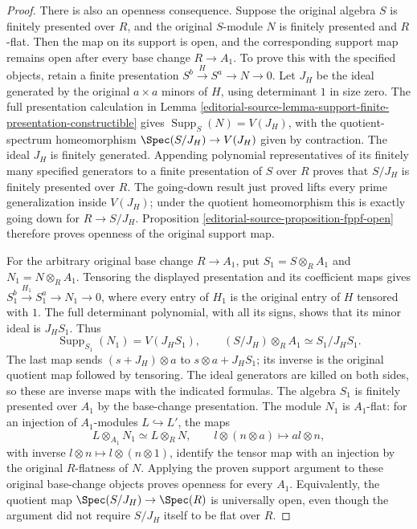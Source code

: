\begin{proof}
\medskip\noindent
There is also an openness consequence. Suppose the
original algebra $S$ is finitely presented over $R$,
and the original $S$-module $N$ is finitely presented
and $R$-flat. Then the map on its support is open,
and the corresponding support map remains open
after every base change $R\to A_1$.
To prove this with the specified objects, retain
a finite presentation $S^b\xrightarrow{H}S^a\to N\to0$.
Let $J_H$ be the ideal generated by the original
$a\times a$ minors of $H$, using determinant $1$
in size zero. The full presentation calculation in
Lemma \ref{editorial-source-lemma-support-finite-presentation-constructible}
gives $\operatorname{Supp}_S(N)=V(J_H)$, with the
quotient-spectrum homeomorphism
$\Spec(S/J_H)\to V(J_H)$ given by contraction.
The ideal $J_H$ is finitely generated. Appending
polynomial representatives of its finitely many
specified generators to a finite presentation of
$S$ over $R$ proves that $S/J_H$ is finitely
presented over $R$. The going-down result just
proved lifts every prime generalization inside
$V(J_H)$; under the quotient homeomorphism this
is exactly going down for $R\to S/J_H$.
Proposition \ref{editorial-source-proposition-fppf-open} therefore
proves openness of the original support map.

For the arbitrary original base change $R\to A_1$,
put $S_1=S\otimes_RA_1$ and $N_1=N\otimes_RA_1$.
Tensoring the displayed presentation and its
coefficient maps gives
$S_1^b\xrightarrow{H_1}S_1^a\to N_1\to0$,
where every entry of $H_1$ is the original entry
of $H$ tensored with $1$. The full determinant
polynomial, with all its signs, shows that its
minor ideal is $J_HS_1$. Thus
$$
\operatorname{Supp}_{S_1}(N_1)=V(J_HS_1),
\qquad
(S/J_H)\otimes_RA_1\simeq S_1/J_HS_1.
$$
The last map sends $(s+J_H)\otimes a$ to
$s\otimes a+J_HS_1$; its inverse is the
original quotient map followed by tensoring.
The ideal generators are killed on both sides,
so these are inverse maps with the indicated
formulas. The algebra $S_1$ is finitely presented
over $A_1$ by the base-change presentation.
The module $N_1$ is $A_1$-flat: for an injection
of $A_1$-modules $L\hookrightarrow L'$, the maps
$$
L\otimes_{A_1}N_1\simeq L\otimes_RN,
\qquad l\otimes(n\otimes a)\longmapsto al\otimes n,
$$
with inverse $l\otimes n\mapsto l\otimes(n\otimes1)$,
identify the tensor map with an injection by
the original $R$-flatness of $N$.
Applying the proven support argument to these
original base-change objects proves openness
for every $A_1$. Equivalently, the quotient map
$\Spec(S/J_H)\to\Spec(R)$ is universally open,
even though the argument did not require
$S/J_H$ itself to be flat over $R$.


\end{proof}
